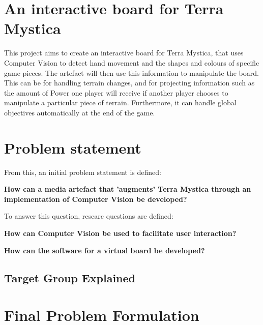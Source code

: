 \section{An interactive board for Terra Mystica}
This project aims to create an interactive board for Terra Mystica, that uses Computer Vision to detect hand movement and the shapes and colours of specific game pieces. The artefact will then use this information to manipulate the board. This can be for handling terrain changes, and for projecting information such as the amount of Power one player will receive if another player chooses to manipulate a particular piece of terrain. Furthermore, it can handle global objectives automatically at the end of the game.

\section{Problem statement}
From this, an initial problem statement is defined: 

\textbf{How can a media artefact that 'augments' Terra Mystica through an implementation of Computer Vision be developed?}

To answer this question, researc questions are defined:

\textbf{How can Computer Vision be used to facilitate user interaction?}

\textbf{How can the software for a virtual board be developed?}

\subsection{Target Group Explained}

\section{Final Problem Formulation}\label{sec:finalprob}

